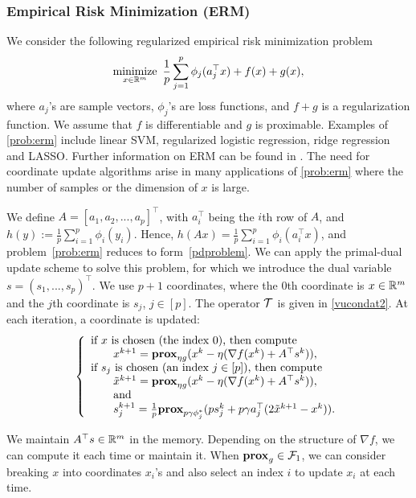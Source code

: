 \subsubsection{Empirical Risk Minimization (ERM)}
We consider the following regularized empirical risk minimization problem
\begin{equation}\label{prob:erm}
\Min_{x\in\RR^m}~ \frac{1}{p}\sum_{j=1}^p\phi_j(a_j^\top x)+f(x)+g(x),
\end{equation}
where $a_j$'s are sample vectors, $\phi_j$'s are loss functions, and $f+g$ is a regularization function. We assume that $f$ is differentiable and $g$ is proximable. Examples of \eqref{prob:erm} include linear SVM, regularized logistic regression, ridge regression and LASSO. Further information on ERM can be found in \cite{hastie2005elements}. The need for coordinate update algorithms arise in many applications of \eqref{prob:erm} where the number of samples or the dimension of $x$ is large. 

We define $A=[a_1,a_2,...,a_p]^\top$, with $a_i^{\top}$ being the $i$th row of $A$, and $h(y):=\frac{1}{p}\sum_{i=1}^p\phi_i(y_i)$. Hence, $h(Ax)=\frac{1}{p}\sum_{i=1}^p\phi_i(a_i^\top x)$, and problem~\eqref{prob:erm} reduces to form~\eqref{pdproblem}.
We can apply the primal-dual update scheme to solve this problem, for which we introduce the dual variable $s = (s_1, ..., s_p)^\top$. We use $p+1$ coordinates, where the $0$th coordinate is $x\in\mathbb{R}^m$ and the $j$th coordinate is $s_j$, $j\in [p]$. The operator ${\mathcal{T}}$ is given in \eqref{vucondat2}. At each iteration, a coordinate is updated:
\begin{equation}
{\left\{
\begin{array}{l}
\text{if }x\text{ is chosen (the index 0), then compute}\\
\qquad {x}^{k+1}=\prox_{\eta g}(x^k-\eta(\nabla f(x^k)+A^\top s^k)),\\
\text{if }s_j\text{ is chosen (an index $j \in [p]$), then compute}\\
\qquad\tilde{x}^{k+1}=\prox_{\eta g}(x^k-\eta(\nabla f(x^k)+A^\top s^k)),\\
\qquad\text{and}\\
\qquad{s}_j^{k+1}=\frac{1}{p}\prox_{p\gamma \phi_j^*} (ps_j^k+p\gamma a_j^\top(2\tilde{x}^{k+1}-x^k)).
\end{array}
\right.
}\end{equation}

We maintain $A^\top s\in \mathbb{R}^m$ in the memory. Depending on the structure of $\nabla f$, we can compute it each time or maintain it. When $\mathbf{prox}_g\in{\mathcal{F}}_1$, we can consider breaking $x$ into coordinates $x_i$'s and also select an index $i$ to update $x_i$ at each time.
